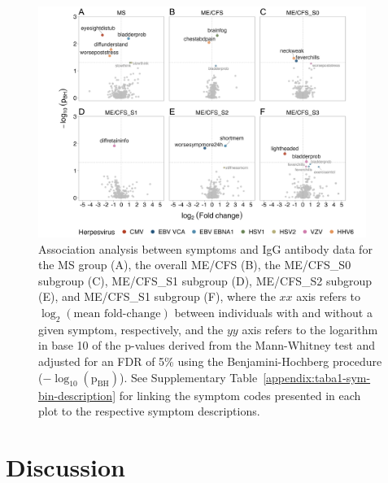 \begin{figure}[h]
    \centering
    \includegraphics[width=0.95\textwidth]{chapter/2023-sym-and-herpesvirus/figures/fig5-association-anslysis-igg-and-cohorts.png}
    \caption[Association analysis between symptoms and IgG antibody data for the MS group and ME/CFS overall and stratified into subgroups]{Association analysis between symptoms and IgG antibody data for the MS group (A), the overall ME/CFS (B), the ME/CFS\_S0 subgroup (C), ME/CFS\_S1 subgroup (D), ME/CFS\_S2 subgroup (E), and ME/CFS\_S1 subgroup (F), where the $xx$ axis refers to $\log_{2}(\text{mean fold-change})$ between individuals with and without a given symptom, respectively, and the $yy$ axis refers to the logarithm in base 10 of the p-values derived from the Mann-Whitney test and adjusted for an FDR of 5\% using the Benjamini-Hochberg procedure ($-\log_{10}(\text{p}_\text{BH})$). See Supplementary Table~\ref{appendix:taba1-sym-bin-description} for linking the symptom codes presented in each plot to the respective symptom descriptions.}
    \label{fig:fig5-association-anslysis-igg-and-cohorts}
\end{figure}

\section{Discussion}

